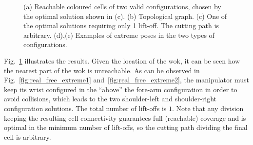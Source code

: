 \documentclass[journal]{IEEEtran}
\begin{document}
\begin{figure}[t]
\centering
{}
 \hfil
{}
\caption{(a) Reachable coloured cells of two valid configurations, chosen by the optimal solution shown in (c). 
(b) Topological graph. (c) One of the optimal solutions requiring only 1 lift-off. 
The cutting path is arbitrary. (d),(e) Examples of extreme poses in the two types of configurations.}
\label{fig:realworld_no_obs}
\end{figure}


Fig.~\ref{fig:realworld_no_obs} illustrates the results. Given the location of the wok, it can be seen how the nearest %
part of the wok is unreachable. 
As can be observed in Fig.~\ref{fig:real_free_extreme1} and~\ref{fig:real_free_extreme2}, 
the manipulator must keep its wrist configured in the ``above'' the fore-arm configuration in order to 
avoid collisions, which leads to the two shoulder-left and shoulder-right configuration solutions. 
The total number of lift-offs is $1$. 
Note that any division keeping the resulting cell connectivity guarantees full (reachable) coverage and is optimal in the minimum number of lift-offs, so the cutting path dividing the final cell is arbitrary. 
\end{document}
